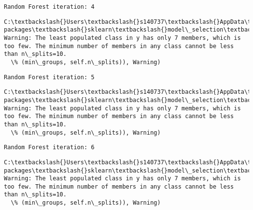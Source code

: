 \documentclass[11pt]{article}
\begin{document}
    \begin{Verbatim}[commandchars=\\\{\}]
Random Forest iteration: 4 

    \end{Verbatim}

    \begin{Verbatim}[commandchars=\\\{\}]
C:\textbackslash{}Users\textbackslash{}s140737\textbackslash{}AppData\textbackslash{}Local\textbackslash{}Continuum\textbackslash{}anaconda3\textbackslash{}lib\textbackslash{}site-packages\textbackslash{}sklearn\textbackslash{}model\_selection\textbackslash{}\_split.py:605: Warning: The least populated class in y has only 7 members, which is too few. The minimum number of members in any class cannot be less than n\_splits=10.
  \% (min\_groups, self.n\_splits)), Warning)

    \end{Verbatim}

    \begin{Verbatim}[commandchars=\\\{\}]
Random Forest iteration: 5 

    \end{Verbatim}

    \begin{Verbatim}[commandchars=\\\{\}]
C:\textbackslash{}Users\textbackslash{}s140737\textbackslash{}AppData\textbackslash{}Local\textbackslash{}Continuum\textbackslash{}anaconda3\textbackslash{}lib\textbackslash{}site-packages\textbackslash{}sklearn\textbackslash{}model\_selection\textbackslash{}\_split.py:605: Warning: The least populated class in y has only 7 members, which is too few. The minimum number of members in any class cannot be less than n\_splits=10.
  \% (min\_groups, self.n\_splits)), Warning)

    \end{Verbatim}

    \begin{Verbatim}[commandchars=\\\{\}]
Random Forest iteration: 6 

    \end{Verbatim}

    \begin{Verbatim}[commandchars=\\\{\}]
C:\textbackslash{}Users\textbackslash{}s140737\textbackslash{}AppData\textbackslash{}Local\textbackslash{}Continuum\textbackslash{}anaconda3\textbackslash{}lib\textbackslash{}site-packages\textbackslash{}sklearn\textbackslash{}model\_selection\textbackslash{}\_split.py:605: Warning: The least populated class in y has only 7 members, which is too few. The minimum number of members in any class cannot be less than n\_splits=10.
  \% (min\_groups, self.n\_splits)), Warning)

    \end{Verbatim}
\end{document}
